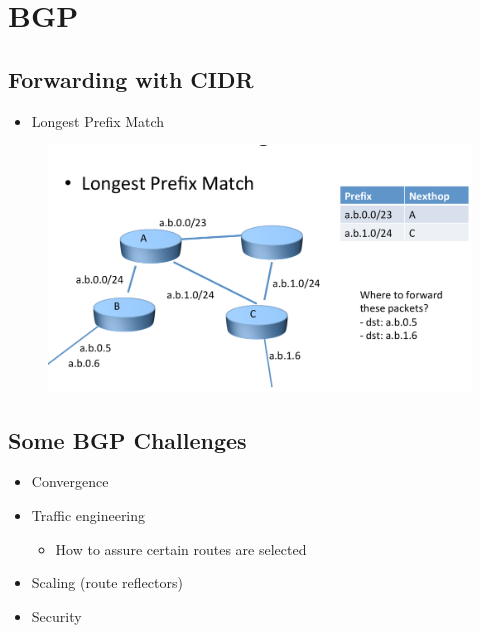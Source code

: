 \section{BGP}
\subsection{Forwarding with CIDR}
\begin{itemize}
    \item Longest Prefix Match
\end{itemize}
\begin{figure}[H]
    \includegraphics[width=\textwidth]{lazy/longestprefix.png}
\end{figure}

\subsection{Some BGP Challenges}
\begin{itemize}
    \item Convergence
    \item Traffic engineering
          \begin{itemize}
              \item How to assure certain routes are selected
          \end{itemize}
    \item Scaling (route reflectors)
    \item Security
\end{itemize}

